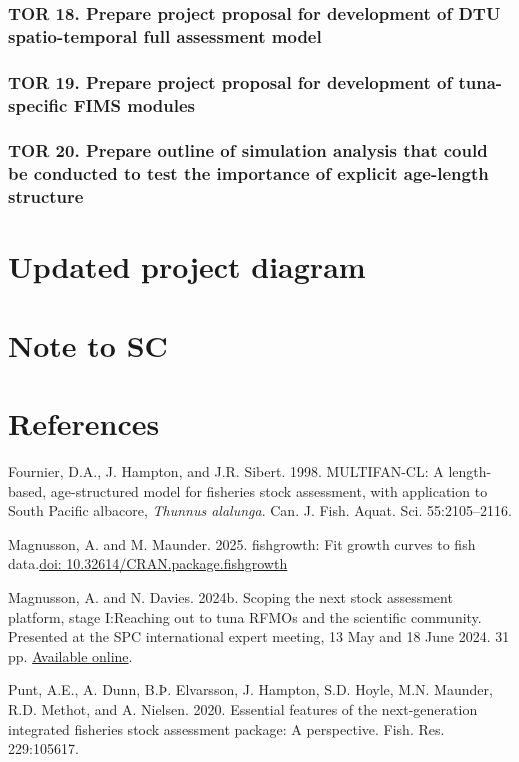 \documentclass{SCreport}
\newcommand\blob
{https://github.com/PacificCommunity/ofp-sam-transition-plan/blob/main}
\newcommand\present{\blob/presentations}
\begin{document}
\subsubsection{TOR 18. Prepare project proposal for development of DTU
  spatio-temporal full assessment model}

\subsubsection{TOR 19. Prepare project proposal for development of tuna-specific
  FIMS modules}

\subsubsection{TOR 20. Prepare outline of simulation analysis that could be
  conducted to test the importance of explicit age-length structure}

\section{Updated project diagram}

\section{Note to SC}

\section{References}

\sloppy\setlength{}

\begin{description}\setlength\itemsep{0ex}
  \item Fournier, D.A., J. Hampton, and J.R. Sibert. 1998. MULTIFAN-CL: A
  length-based, age-structured model for fisheries stock assessment, with
  application to South Pacific albacore, \textit{Thunnus alalunga}. Can. J.
  Fish. Aquat. Sci. 55:2105--2116.
  \item Magnusson, A. and M. Maunder. 2025. fishgrowth: Fit growth curves to
  fish data.\linebreak \href{https://doi.org/10.32614/CRAN.package.fishgrowth}
  {doi: 10.32614/CRAN.package.fishgrowth}
  \item Magnusson, A. and N. Davies. 2024b. Scoping the next stock assessment
  platform, stage I:\linebreak Reaching out to tuna RFMOs and the scientific
  community. Presented at the SPC international expert meeting, 13 May and 18
  June 2024. 31 pp.
  \href{\present/2024_05_13_experts_scoping/2024_05_13_experts_scoping.pdf}
  {Available online}.
  \item Punt, A.E., A. Dunn, B.Þ. Elvarsson, J. Hampton, S.D. Hoyle, M.N.
  Maunder, R.D. Methot, and A. Nielsen. 2020. Essential features of the
  next-generation integrated fisheries stock assessment package: A perspective.
  Fish. Res. 229:105617.
\end{description}
\end{document}
